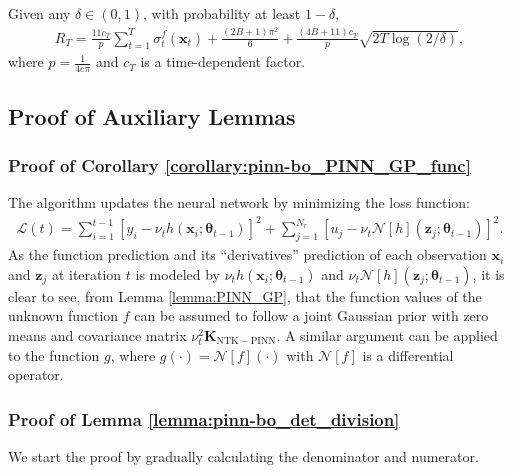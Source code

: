 \begin{auxlemma} 
\label{lemma:regret}
Given any $\delta \in (0, 1)$, with probability at least $1 - \delta$, 
\begin{align*}
    R_T = 
    \frac{11c_T}{p}\sum_{t=1}^T \sigma_t^f(\mathbf{x}_t) + \frac{(2B+1)\pi^2}{6} + \frac{(4B+11)c_T}{p} \sqrt{2T\log(2/\delta)} ,
\end{align*}
where $p=\frac{1}{4e\pi}$ and $c_T$ is a time-dependent factor. 
\end{auxlemma}

\subsection{Proof of Auxiliary Lemmas}
\label{section:pinn-bo_aux_proofs}
\subsubsection{Proof of Corollary  \ref{corollary:pinn-bo_PINN_GP_func}}
The algorithm updates the neural network by minimizing the loss function: \begin{align*}
    \mathcal{L}(t) = \sum^{t-1}_{i=1} [y_i - \nu_t h(\mathbf{x}_i; \boldsymbol{\theta}_{t-1})]^2 + \sum^{N_r}_{j=1}[u_j - \nu_t \mathcal{N}[h](\mathbf{z}_j; \boldsymbol{\theta}_{t-1})]^2.
\end{align*} 
As the function prediction and its ``derivatives'' prediction of each observation $\mathbf{x}_i$ and $\mathbf{z}_j$ at iteration $t$ is modeled by $\nu_t h(\mathbf{x}_i; \boldsymbol{\theta}_{t-1})$ and $\nu_t \mathcal{N}[h](\mathbf{z}_j; \boldsymbol{\theta}_{t-1})$, it is clear to see, from Lemma \ref{lemma:PINN_GP}, that the function values of the unknown function $f$ can be assumed to follow a joint Gaussian prior with zero means and covariance matrix $\nu_t^2 \mathbf{K}_\mathrm{NTK-PINN}$. A similar argument can be applied to the function $g$, where $g(\cdot) = \mathcal{N}[f] (\cdot)$ with $\mathcal{N}[f]$ is a differential operator. 
\subsubsection{Proof of Lemma \ref{lemma:pinn-bo_det_division}}
We start the proof by gradually calculating the denominator and numerator.
